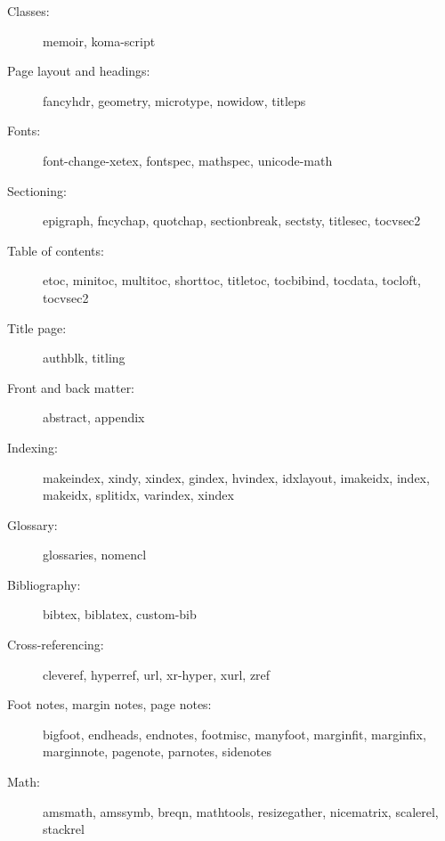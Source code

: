 \documentclass{article}
\def\pkg#1{#1}%
\def\prog#1{\detokenize{#1}}%
\renewcommand*{\pkg}[1]{#1}
\renewcommand*{\prog}[1]{#1}
\begin{document}
\begin{multicols}{2}

\begin{description}

\item[Classes:] \pkg{memoir}, \pkg{koma-script}

\item[Page layout and headings:] \pkg{fancyhdr}, \pkg{geometry}, \pkg{microtype},
    \pkg{nowidow}, \pkg{titleps}

\item[Fonts:] \pkg{font-change-xetex}, \pkg{fontspec}, \pkg{mathspec}, \pkg{unicode-math}

\item[Sectioning:] \pkg{epigraph}, \pkg{fncychap}, \pkg{quotchap},
    \pkg{sectionbreak}, \pkg{sectsty},
    \pkg{titlesec}, \pkg{tocvsec2}

\item[Table of contents:] \pkg{etoc}, \pkg{minitoc}, \pkg{multitoc}, \pkg{shorttoc},
    \pkg{titletoc}, \pkg{tocbibind}, \pkg{tocdata}, \pkg{tocloft}, \pkg{tocvsec2}

\item[Title page:] \pkg{authblk}, \pkg{titling}

\item[Front and back matter:] \pkg{abstract}, \pkg{appendix}

\item[Indexing:] \prog{makeindex}, \prog{xindy}, \prog{xindex}, \pkg{gindex},
    \pkg{hvindex}, \pkg{idxlayout}, \pkg{imakeidx}, \pkg{index}, \pkg{makeidx},
    \pkg{splitidx}, \pkg{varindex}, \pkg{xindex}

\item[Glossary:] \pkg{glossaries}, \pkg{nomencl}

\item[Bibliography:] \prog{bibtex}, \pkg{biblatex}, \prog{custom-bib}

\item[Cross-referencing:] \pkg{cleveref}, \pkg{hyperref}, \pkg{url}, \pkg{xr-hyper},
    \pkg{xurl}, \pkg{zref}

\item[Foot notes, margin notes, page notes:]
    \pkg{bigfoot}, \pkg{endheads}, \pkg{endnotes}, \pkg{footmisc},
    \pkg{manyfoot}, \pkg{marginfit}, \pkg{marginfix}, \pkg{marginnote},
    \pkg{pagenote}, \pkg{parnotes}, \pkg{sidenotes}

\item[Math:] \pkg{amsmath}, \pkg{amssymb}, \pkg{breqn}, \pkg{mathtools},
    \pkg{resizegather}, \pkg{nicematrix}, \pkg{scalerel}, \pkg{stackrel}


\end{description}
\end{multicols}
\end{document}
